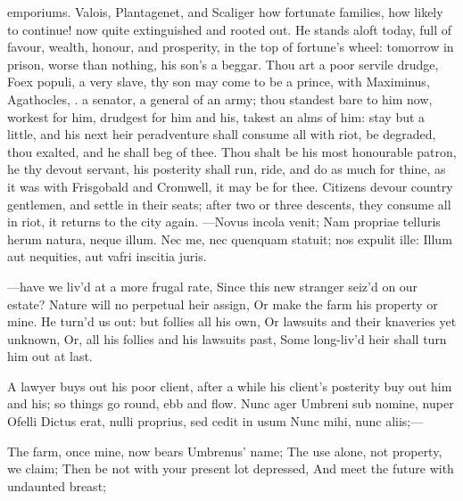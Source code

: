 {emporiums. Valois, Plantagenet, and Scaliger how fortunate families,
how likely to continue! now quite extinguished and rooted out. He
stands aloft today, full of favour, wealth, honour, and prosperity, in
the top of fortune's wheel: tomorrow in prison, worse than nothing, his
son's a beggar. Thou art a poor servile drudge, Foex populi, a very
slave, thy son may come to be a prince, with Maximinus, Agathocles, \etc{}.
a senator, a general of an army; thou standest bare to him now, workest
for him, drudgest for him and his, takest an alms of him: stay but a
little, and his next heir peradventure shall consume all with riot, be
degraded, thou exalted, and he shall beg of thee. Thou shalt be his
most honourable patron, he thy devout servant, his posterity shall run,
ride, and do as much for thine, as it was with Frisgobald and
Cromwell, it may be for thee. Citizens devour country gentlemen, and
settle in their seats; after two or three descents, they consume all in
riot, it returns to the city again.
---Novus incola venit;
Nam propriae telluris herum natura, neque illum.
Nec me, nec quenquam statuit; nos expulit ille:
Illum aut nequities, aut vafri inscitia juris.

---have we liv'd at a more frugal rate,
Since this new stranger seiz'd on our estate?
Nature will no perpetual heir assign,
Or make the farm his property or mine.
He turn'd us out: but follies all his own,
Or lawsuits and their knaveries yet unknown,
Or, all his follies and his lawsuits past,
Some long-liv'd heir shall turn him out at last.

A lawyer buys out his poor client, after a while his client's posterity
buy out him and his; so things go round, ebb and flow.
Nunc ager Umbreni sub nomine, nuper Ofelli
Dictus erat, nulli proprius, sed cedit in usum
Nunc mihi, nunc aliis;---

The farm, once mine, now bears Umbrenus' name;
The use alone, not property, we claim;
Then be not with your present lot depressed,
And meet the future with undaunted breast;

}
